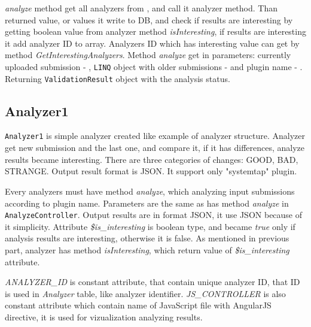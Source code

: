 \emph{analyze} method get all analyzers from \emph{}, and call it analyzer method. Than returned value, or values it write to DB, and check if results are interesting by getting boolean value from analyzer method \emph{isInteresting}, if results are interesting it add analyzer ID to \emph{} array. Analyzers ID which has interesting value can get by method \emph{GetInterestingAnalyzers}. Method \emph{analyze} get in parameters: currently uploaded submission - \emph{}, \texttt{LINQ} object with older submissions - \emph{} and plugin name - \emph{}. Returning \texttt{ValidationResult} object with the analysis status.

\subsection{Analyzer1}

\texttt{Analyzer1} is simple analyzer created like example of analyzer structure. Analyzer get new submission and the last one, and compare it, if it has differences, analyze results became interesting. There are three categories of changes: GOOD, BAD, STRANGE. Output result format is JSON. It support only "systemtap" plugin.

Every analyzers must have method \emph{analyze}, which analyzing input submissions according to plugin name. Parameters are the same as has method \emph{analyze} in \texttt{AnalyzeController}. Output results are in format JSON, it use JSON because of it simplicity. Attribute \emph{\$is\_interesting} is boolean type, and became \emph{true} only if analysis results are interesting, otherwise it is false. As mentioned in previous part, analyzer has method \emph{isInteresting}, which return value of \emph{\$is\_interesting} attribute.

\emph{ANALYZER\_ID} is constant attribute, that contain unique analyzer ID, that ID is used in \emph{Analyzer} table, like analyzer identifier. \emph{JS\_CONTROLLER} is also constant attribute which contain name of JavaScript file with AngularJS directive, it is used for vizualization analyzing results.

